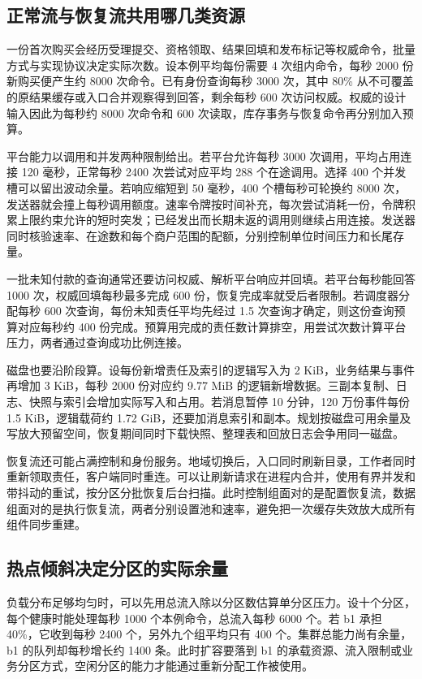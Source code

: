 \subsection{正常流与恢复流共用哪几类资源}

一份首次购买会经历受理提交、资格领取、结果回填和发布标记等权威命令，批量方式与实现协议决定实际次数。设本例平均每份需要 4 次组内命令，每秒 2000 份新购买便产生约 8000 次命令。已有身份查询每秒 3000 次，其中 80\% 从不可覆盖的原结果缓存或入口合并观察得到回答，剩余每秒 600 次访问权威。权威的设计输入因此为每秒约 8000 次命令和 600 次读取，库存事务与恢复命令再分别加入预算。

平台能力以调用和并发两种限制给出。若平台允许每秒 3000 次调用，平均占用连接 120 毫秒，正常每秒 2400 次尝试对应平均 288 个在途调用。选择 400 个并发槽可以留出波动余量。若响应缩短到 50 毫秒，400 个槽每秒可轮换约 8000 次，发送器就会撞上每秒调用额度。速率令牌按时间补充，每次尝试消耗一份，令牌积累上限约束允许的短时突发；已经发出而长期未返的调用则继续占用连接。发送器同时核验速率、在途数和每个商户范围的配额，分别控制单位时间压力和长尾存量。

一批未知付款的查询通常还要访问权威、解析平台响应并回填。若平台每秒能回答 1000 次，权威回填每秒最多完成 600 份，恢复完成率就受后者限制。若调度器分配每秒 600 次查询，每份未知责任平均先经过 1.5 次查询才确定，则这份查询预算对应每秒约 400 份完成。预算用完成的责任数计算排空，用尝试次数计算平台压力，两者通过查询成功比例连接。

磁盘也要沿阶段算。设每份新增责任及索引的逻辑写入为 2 KiB，业务结果与事件再增加 3 KiB，每秒 2000 份对应约 9.77 MiB 的逻辑新增数据。三副本复制、日志、快照与索引会增加实际写入和占用。若消息暂停 10 分钟，120 万份事件每份 1.5 KiB，逻辑载荷约 1.72 GiB，还要加消息索引和副本。规划按磁盘可用余量及写放大预留空间，恢复期间同时下载快照、整理表和回放日志会争用同一磁盘。

恢复流还可能占满控制和身份服务。地域切换后，入口同时刷新目录，工作者同时重新领取责任，客户端同时重连。可以让刷新请求在进程内合并，使用有界并发和带抖动的重试，按分区分批恢复后台扫描。此时控制组面对的是配置恢复流，数据组面对的是执行恢复流，两者分别设置池和速率，避免把一次缓存失效放大成所有组件同步重建。

\subsection{热点倾斜决定分区的实际余量}

负载分布足够均匀时，可以先用总流入除以分区数估算单分区压力。设十个分区，每个健康时能处理每秒 1000 个本例命令，总流入每秒 6000 个。若 b1 承担 40\%，它收到每秒 2400 个，另外九个组平均只有 400 个。集群总能力尚有余量，b1 的队列却每秒增长约 1400 条。此时扩容要落到 b1 的承载资源、流入限制或业务分区方式，空闲分区的能力才能通过重新分配工作被使用。

